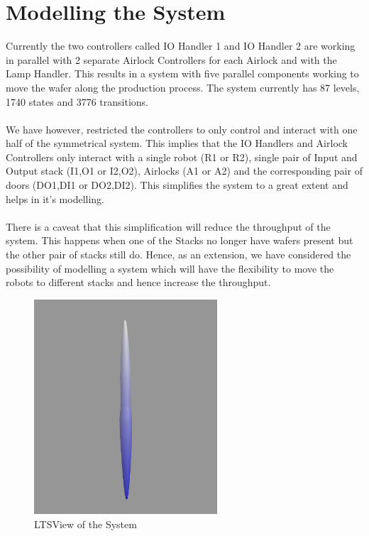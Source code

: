 \documentclass[a4paper,12pt]{article}
\begin{document}
\newpage
\section{Modelling the System}
Currently the two controllers called IO Handler 1 and IO Handler 2 are working in parallel with 2 separate Airlock Controllers for each Airlock and with the Lamp Handler. This results in a system with five parallel components working to move the wafer along the production process. The system currently has 87 levels, 1740 states and 3776 transitions.
\\
\\We have however, restricted the controllers to only control and interact with one half of the symmetrical system. This implies that the IO Handlers and Airlock Controllers only interact with a single robot (R1 or R2), single pair of Input and Output stack (I1,O1 or I2,O2), Airlocks (A1 or A2) and the corresponding pair of doors (DO1,DI1 or DO2,DI2). This simplifies the system to a great extent and helps in it's modelling.
\\
\\There is a caveat that this simplification will reduce the throughput of the system. This happens when one of the Stacks no longer have wafers present but the other pair of stacks still do. Hence, as an extension, we have considered the possibility of modelling a system which will have the flexibility to move the robots to different stacks and hence increase the throughput. 
\begin{figure}[ht]
\centering
    \includegraphics[width=\textwidth, height=8cm]{3D-Model.png}
  \caption{LTSView of the System}
  \label{fig:ltsview}
\end{figure}
\newpage
\end{document}

